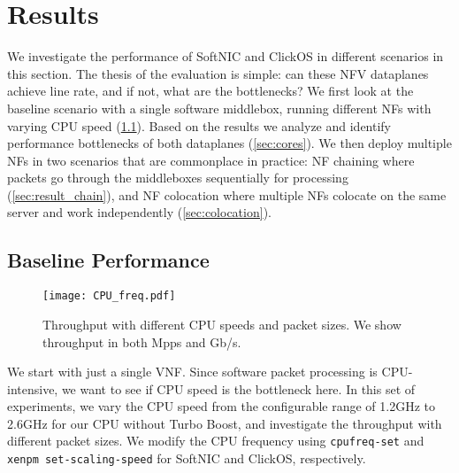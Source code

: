 

\section{Results}
\label{sec:result}
We investigate the performance of SoftNIC and ClickOS in different scenarios in this section. 
The thesis of the evaluation is simple: can these NFV dataplanes achieve line rate, and if not, what are the bottlenecks?
We first look at the baseline scenario with a single software middlebox, running different NFs with varying CPU speed (\cref{sec:frequency}). Based on the results we analyze and identify performance bottlenecks of both dataplanes (\cref{sec:cores}). We then deploy multiple NFs in two scenarios that are commonplace in practice: NF chaining where packets go through the middleboxes sequentially for processing (\cref{sec:result_chain}), and NF colocation where multiple NFs colocate on the same server and work independently (\cref{sec:colocation}).


\subsection{Baseline Performance}
\label{sec:frequency}

\begin{figure*}[!th]
    \vspace{-1mm}
    \captionsetup{justification=centering}
    \centering
    \texttt{[image: CPU\_freq.pdf]}
    \caption{Throughput with different CPU speeds and packet sizes. We show throughput in both Mpps and Gb/s.}
    \label{fig:CPU_freq}
    \vspace{-5mm}
\end{figure*}


We start with just a single VNF. Since software packet processing is CPU-intensive, we want to see if CPU speed is the bottleneck here. In this set of experiments, we vary the CPU speed from the configurable range of 1.2GHz to 2.6GHz for our CPU without Turbo Boost, and investigate the throughput with different packet sizes. We modify the CPU frequency using {\tt cpufreq-set} and {\tt xenpm set-scaling-speed} for SoftNIC and ClickOS, respectively.



